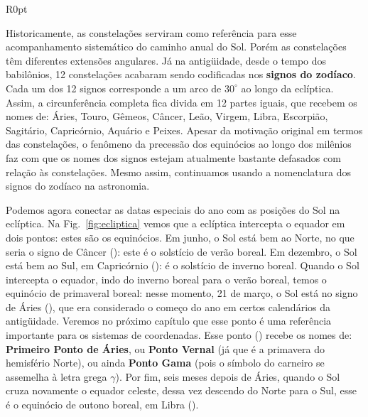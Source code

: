 \begin{wrapfigure}{R}{0pt}

\caption{Relação entre a eclíptica e o equador celeste.}
\label{fig:ecliptica}
\end{wrapfigure}

Historicamente, as constelações serviram como referência para esse acompanhamento sistemático do caminho anual do Sol. Porém as constelações têm diferentes extensões angulares. Já na antigüidade, desde o tempo dos babilônios, 12 constelações acabaram sendo codificadas nos \textbf{signos do zodíaco}. Cada um dos 12 signos corresponde a um arco de $30^{\circ}$ ao longo da eclíptica. Assim, a circunferência completa fica divida em 12 partes iguais, que recebem os nomes de: Áries, Touro, Gêmeos, Câncer, Leão, Virgem, Libra, Escorpião, Sagitário, Capricórnio, Aquário e Peixes. Apesar da motivação original em termos das constelações, o fenômeno da precessão dos equinócios ao longo dos milênios faz com que os nomes dos signos estejam atualmente bastante defasados com relação às constelações. Mesmo assim, continuamos usando a nomenclatura dos signos do zodíaco na astronomia.

Podemos agora conectar as datas especiais do ano com as posições do Sol na eclíptica. Na Fig.~\ref{fig:ecliptica} vemos que a eclíptica intercepta o equador em dois pontos: estes são os equinócios. Em junho, o Sol está bem ao Norte, no que seria o signo de Câncer (\Cancer): este é o solstício de verão boreal. Em dezembro, o Sol está bem ao Sul, em Capricórnio (\Capricorn): é o solstício de inverno boreal. Quando o Sol intercepta o equador, indo do inverno boreal para o verão boreal, temos o equinócio de primaveral boreal: nesse momento, 21 de março, o Sol está no signo de Áries (\Aries), que era considerado o começo do ano em certos calendários da antigüidade. Veremos no próximo capítulo que esse ponto é uma referência importante para os sistemas de coordenadas. Esse ponto (\Aries) recebe os nomes de: \textbf{Primeiro Ponto de Áries}, ou \textbf{Ponto Vernal} (já que é a primavera do hemisfério Norte), ou ainda \textbf{Ponto Gama} (pois o símbolo do carneiro se assemelha à letra grega $\gamma$). Por fim, seis meses depois de Áries, quando o Sol cruza novamente o equador celeste, dessa vez descendo do Norte para o Sul, esse é o equinócio de outono boreal, em Libra (\Libra).
